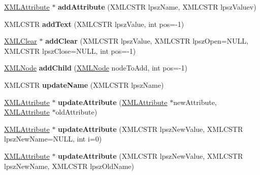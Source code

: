 \begin{DoxyCompactItemize}
\hyperlink{struct_x_m_l_attribute}{X\+M\+L\+Attribute} $\ast$ {\bfseries add\+Attribute} (X\+M\+L\+C\+S\+TR lpsz\+Name, X\+M\+L\+C\+S\+TR lpsz\+Valuev)
\item 
\mbox{\label{struct_x_m_l_node_aa4210523be86adbfb39ad52469a9a072}} 
X\+M\+L\+C\+S\+TR {\bfseries add\+Text} (X\+M\+L\+C\+S\+TR lpsz\+Value, int pos=-\/1)
\item 
\mbox{\label{struct_x_m_l_node_ad98c759ea686cd8b30314259f942aabf}} 
\hyperlink{struct_x_m_l_clear}{X\+M\+L\+Clear} $\ast$ {\bfseries add\+Clear} (X\+M\+L\+C\+S\+TR lpsz\+Value, X\+M\+L\+C\+S\+TR lpsz\+Open=N\+U\+LL, X\+M\+L\+C\+S\+TR lpsz\+Close=N\+U\+LL, int pos=-\/1)
\item 
\mbox{\label{struct_x_m_l_node_adcb76cce8d914425b03fdd9a06ee2a47}} 
\hyperlink{struct_x_m_l_node}{X\+M\+L\+Node} {\bfseries add\+Child} (\hyperlink{struct_x_m_l_node}{X\+M\+L\+Node} node\+To\+Add, int pos=-\/1)
\item 
\mbox{\label{struct_x_m_l_node_ae08b643a2b87a77bad3c70eb57ea3043}} 
X\+M\+L\+C\+S\+TR {\bfseries update\+Name} (X\+M\+L\+C\+S\+TR lpsz\+Name)
\item 
\mbox{\label{struct_x_m_l_node_adfbd017929a40d6584350e7f3652fcbd}} 
\hyperlink{struct_x_m_l_attribute}{X\+M\+L\+Attribute} $\ast$ {\bfseries update\+Attribute} (\hyperlink{struct_x_m_l_attribute}{X\+M\+L\+Attribute} $\ast$new\+Attribute, \hyperlink{struct_x_m_l_attribute}{X\+M\+L\+Attribute} $\ast$old\+Attribute)
\item 
\mbox{\label{struct_x_m_l_node_a21bdabc3bea95c06b5033a0a0c76afe4}} 
\hyperlink{struct_x_m_l_attribute}{X\+M\+L\+Attribute} $\ast$ {\bfseries update\+Attribute} (X\+M\+L\+C\+S\+TR lpsz\+New\+Value, X\+M\+L\+C\+S\+TR lpsz\+New\+Name=N\+U\+LL, int i=0)
\item 
\mbox{\label{struct_x_m_l_node_ab81bdf55327b63350eaf84835b8cf9b1}} 
\hyperlink{struct_x_m_l_attribute}{X\+M\+L\+Attribute} $\ast$ {\bfseries update\+Attribute} (X\+M\+L\+C\+S\+TR lpsz\+New\+Value, X\+M\+L\+C\+S\+TR lpsz\+New\+Name, X\+M\+L\+C\+S\+TR lpsz\+Old\+Name)
\item 
\mbox{\label{struct_x_m_l_node_aad04ffd86ca67253bbc81f941608f8d2}} 

\end{DoxyCompactItemize}
